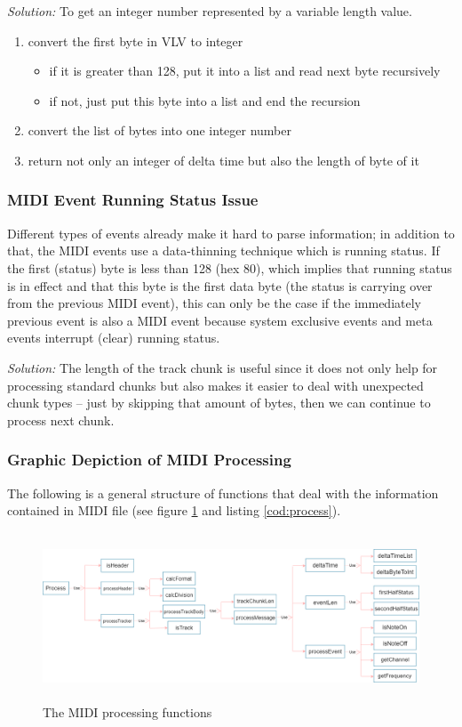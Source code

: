 \documentclass[runningheads]{llncs}
\begin{document}
\textit{Solution:}
To get an integer number represented by a  variable length value.
\begin{enumerate}
    \item convert the first byte in VLV to integer
        \begin{itemize}
            \item if it is greater than 128, put it into a list and read next byte recursively
            \item if not, just put this byte into a list and end the recursion
        \end{itemize}
    \item convert the list of bytes into one integer number
    \item return not only an integer of delta time but also the length of byte of it
\end{enumerate}

\subsubsection{MIDI Event Running Status Issue}
Different types of events already make it hard to parse information; in addition to that, the MIDI events use a data-thinning technique which is running status.
If the first (status) byte is less than 128 (hex 80), which implies that running status is in effect and that this byte is the first data byte (the status is carrying over from the previous MIDI event), this can only be the case if the immediately previous event is also a MIDI event because system exclusive events and meta events interrupt (clear) running status.

\textit{Solution:}
The length of the track chunk is useful since it does not only help for processing standard chunks but also makes it easier to deal with unexpected chunk types -- just by skipping that amount of bytes, then we can continue to process next chunk.

\subsubsection{Graphic Depiction of MIDI Processing} 

The following is a general structure of functions that deal with the information contained in MIDI file (see figure \ref{fig:midiprocess} and listing \ref{cod:process}).

\begin{figure}[!htb]
	\includegraphics[width=1\textwidth,height=5cm]{functions.png}
	\caption{The MIDI processing functions}
	\label{fig:midiprocess}
\end{figure}
\end{document}
